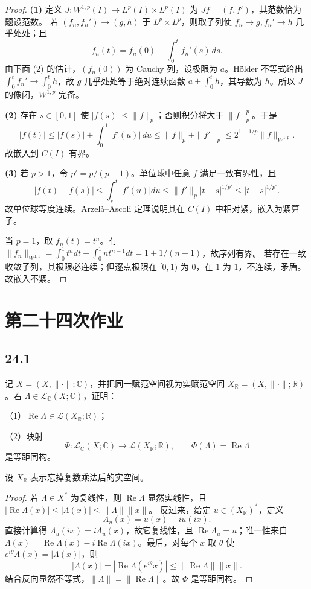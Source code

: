 \begin{proof}
\textbf{(1)} 定义 $J:W^{1,p}(I)\to L^p(I)\times L^p(I)$ 为 $Jf=(f,f')$，其范数恰为题设范数。
若 $(f_n,f_n')\to(g,h)$ 于 $L^p\times L^p$，则取子列使 $f_n\to g,f_n'\to h$ 几乎处处；且
\[
 f_n(t)=f_n(0)+\int_0^t f_n'(s)\,ds.
\]
由下面 (2) 的估计，$(f_n(0))$ 为 Cauchy 列，设极限为 $a$。Hölder 不等式给出
$\int_0^t f_n'\to\int_0^t h$，故 $g$ 几乎处处等于绝对连续函数
$a+\int_0^t h$，其导数为 $h$。所以 $J$ 的像闭，$W^{1,p}$ 完备。

\textbf{(2)} 存在 $s\in[0,1]$ 使 $|f(s)|\leq\|f\|_p$；否则积分将大于 $\|f\|_p^p$。于是
\[
 |f(t)|\leq |f(s)|+\int_0^1|f'(u)|\,du
 \leq\|f\|_p+\|f'\|_p\leq2^{1-1/p}\|f\|_{W^{1,p}}.
\]
故嵌入到 $C(I)$ 有界。

\textbf{(3)} 若 $p>1$，令 $p'=p/(p-1)$。单位球中任意 $f$ 满足一致有界性，且
\[
 |f(t)-f(s)|\leq\int_s^t|f'(u)|du
 \leq\|f'\|_p|t-s|^{1/p'}\leq|t-s|^{1/p'}.
\]
故单位球等度连续。Arzelà--Ascoli 定理说明其在 $C(I)$ 中相对紧，嵌入为紧算子。

当 $p=1$，取 $f_n(t)=t^n$。有
$\|f_n\|_{W^{1,1}}=\int_0^1t^n dt+\int_0^1nt^{n-1}dt=1+1/(n+1)$，故序列有界。
若存在一致收敛子列，其极限必连续；但逐点极限在 $[0,1)$ 为 $0$，在 $1$ 为 $1$，不连续，矛盾。
故嵌入不紧。
\end{proof}

\section{第二十四次作业}

\subsection*{24.1}
\begin{problem}
记 $X=(X,\|\cdot\|;\mathbb C)$，并把同一赋范空间视为实赋范空间
$X_{\mathbb R}=(X,\|\cdot\|;\mathbb R)$。若
$\Lambda\in\mathcal L_{\mathbb C}(X;\mathbb C)$，证明：

（1）$\operatorname{Re}\Lambda\in\mathcal L(X_{\mathbb R};\mathbb R)$；

（2）映射
\[
 \Phi:\mathcal L_{\mathbb C}(X;\mathbb C)
 \longrightarrow\mathcal L(X_{\mathbb R};\mathbb R),
 \qquad \Phi(\Lambda)=\operatorname{Re}\Lambda
\]
是等距同构。
\end{problem}

设 $X_{\mathbb R}$ 表示忘掉复数乘法后的实空间。
\begin{proof}
若 $\Lambda\in X^*$ 为复线性，则 $\operatorname{Re}\Lambda$ 显然实线性，且
$|\operatorname{Re}\Lambda(x)|\leq|\Lambda(x)|\leq\|\Lambda\|\|x\|$。
反过来，给定 $u\in(X_{\mathbb R})^*$，定义
\[
 \Lambda_u(x)=u(x)-iu(ix).
\]
直接计算得 $\Lambda_u(ix)=i\Lambda_u(x)$，故它复线性，且 $\operatorname{Re}\Lambda_u=u$；唯一性来自
$\Lambda(x)=\operatorname{Re}\Lambda(x)-i\operatorname{Re}\Lambda(ix)$。最后，对每个 $x$ 取
$\theta$ 使 $e^{i\theta}\Lambda(x)=|\Lambda(x)|$，则
\[
 |\Lambda(x)|=|\operatorname{Re}\Lambda(e^{i\theta}x)|\leq\|\operatorname{Re}\Lambda\|\|x\|.
\]
结合反向显然不等式，$\|\Lambda\|=\|\operatorname{Re}\Lambda\|$。故 $\Phi$ 是等距同构。
\end{proof}

